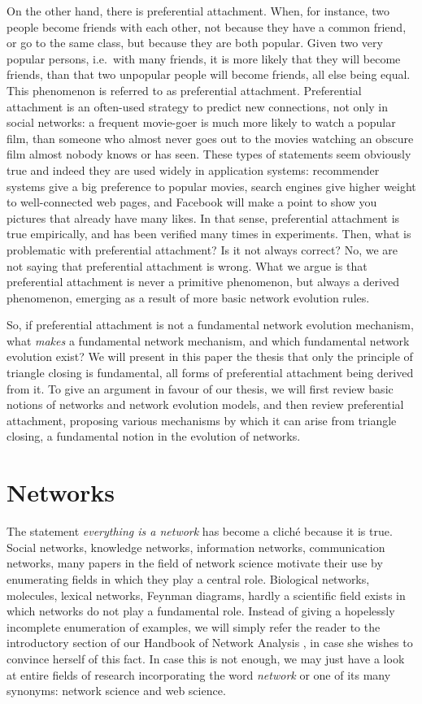 \documentclass{acm_proc_article-sp}
\begin{document}
On the other hand, there is preferential attachment.  When, for
instance, two people become friends with each other, not because they
have a common friend, or go to the same class, but because they are both
popular.  Given two very popular persons, i.e.\ with many friends, it is
more likely that they will become friends, than that two unpopular
people will become friends, all else being equal.  This phenomenon is
referred to as preferential attachment.  Preferential attachment is an
often-used strategy to predict new connections, not only in social
networks: a frequent movie-goer is much more likely to watch a popular
film, than someone who almost never goes out to the movies watching an
obscure film almost nobody knows or has seen.  These types of statements
seem obviously true and indeed they are used widely in application
systems: recommender systems give a big preference to popular movies,
search engines give higher weight to well-connected web pages, and
Facebook will make a point to show you pictures that already have many
likes.  In that sense, preferential attachment is true empirically, and
has been verified many times in experiments.  Then, what is problematic with
preferential attachment?  Is it not always correct?  No, we are not
saying that preferential attachment is wrong.  What we argue is that
preferential attachment is never a primitive phenomenon, but always a
derived phenomenon, emerging as a result of more basic network evolution
rules.

So, if preferential attachment is not a fundamental network evolution
mechanism, what \emph{makes} a fundamental network mechanism, and which
fundamental network evolution exist?  We will present in this paper the
thesis that
only the principle of triangle closing is fundamental, all forms of
preferential attachment being derived from it. 
To give an
argument in favour of our thesis, we will first review basic notions of
networks and network evolution models, and then review 
preferential attachment, proposing various mechanisms by which
it can arise from triangle closing, a fundamental notion in the
evolution of networks. 

\section{Networks}
The statement \emph{everything is a network} has become a cliché because
it is true.  Social networks, knowledge networks, information networks,
communication networks, many papers in the field of network science
motivate their use by enumerating fields in which they play a central
role.  Biological networks, molecules, lexical networks, Feynman
diagrams, hardly a scientific field exists in which networks do not play
a fundamental role.  Instead of giving a hopelessly incomplete
enumeration of examples, we will simply refer the reader to the
introductory section of our Handbook of Network Analysis
\cite{konect:handbook}, in case she wishes to convince herself of
this fact. In case this is not enough, we may just have a look at entire
fields of research incorporating the word \emph{network} or one of its
many synonyms: network science and web science.  
\end{document}
